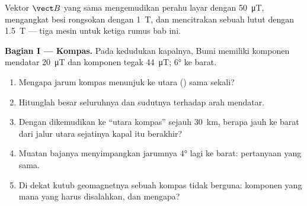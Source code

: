\begin{problem}
\label{pb:g11:magnetic-fields:1}
Vektor $\vect B$ yang sama mengemudikan perahu layar dengan
\qty{50}{\micro T}, mengangkat besi rongsokan dengan \qty{1}{T}, dan
mencitrakan sebuah lutut dengan \qty{1.5}{T} --- tiga mesin untuk
ketiga rumus bab ini.

\medskip
\noindent\textbf{Bagian I --- Kompas.}
Pada kedudukan kapalnya,  Bumi memiliki komponen mendatar
\qty{20}{\micro T} dan komponen tegak \qty{44}{\micro T};
 $\ang{6}$ ke barat.
\begin{enumerate}
  \item Mengapa jarum kompas menunjuk ke utara () sama sekali?
  \item Hitunglah besar  seluruhnya dan sudutnya terhadap arah
        mendatar.
  \item Dengan dikemudikan ke ``utara kompas'' sejauh \qty{30}{km},
        berapa jauh ke barat dari jalur utara sejatinya kapal itu
        berakhir?
  \item Muatan bajanya menyimpangkan jarumnya $\ang{4}$ lagi ke barat:
        pertanyaan yang sama.
  \item Di dekat kutub geomagnetnya sebuah kompas tidak berguna:
        komponen yang mana yang harus disalahkan, dan mengapa?
\end{enumerate}


\end{problem}

